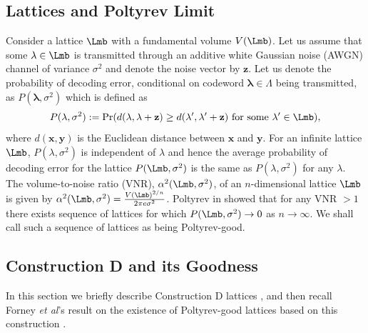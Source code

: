\documentclass[journal]{IEEEtran}
\begin{document}
\subsection{Lattices and Poltyrev Limit}
Consider a lattice $\Lmb$ with a fundamental volume $V(\Lmb)$. Let us assume that some $\mathbf{\lambda}\in\Lmb$ is transmitted through an additive white Gaussian noise (AWGN) channel of variance $\sigma^{2}$ and denote the noise
vector by $\mathbf{z}$. Let us denote the probability of decoding error, conditional on codeword $\mathbf{\lambda}\in\Lambda$ being
transmitted, as $P(\mathbf{\lambda},\sigma^{2})$ which is defined as
\begin{align*}
 P(\mathbf{\lambda},\sigma^{2}):=\Pr(d(\mathbf{\lambda},\mathbf{\lambda}+\mathbf{z})\geq d(\mathbf{\lambda'},\mathbf{\lambda'}+\mathbf{z}) \text{ for some } \mathbf{\lambda'}\in\Lmb),
\end{align*}
where $d(\mathbf{x},\mathbf{y})$ is the Euclidean distance between $\mathbf{x}$ and $\mathbf{y}$. For an infinite lattice $\Lmb$, $P(\lambda,\sigma^{2})$ is independent of $\lambda$ and hence the average probability of decoding error for the lattice  $P(\Lmb,\sigma^{2})$ is the same as $P(\lambda,\sigma^{2})$ for any $\lambda$.
The volume-to-noise ratio (VNR), $\alpha^{2}(\Lmb,\sigma^{2})$,
of an $n$-dimensional lattice $\Lmb$ is given by $\alpha^{2}(\Lmb,\sigma^{2})=\frac{V(\Lmb)^{2/n}}{2\pi e\sigma^{2}}$.
Poltyrev in \cite{poltyrev94} showed that for any VNR $>1$ there exists sequence of lattices for which $P(\Lmb,\sigma^{2}) \rightarrow 0$ as $n \rightarrow \infty$. We shall call such a sequence of lattices as being Poltyrev-good.

\subsection{Construction D and its Goodness}
In this section we briefly describe Construction D lattices \cite{BarnesSloane83}, \cite{conway1999sphere} and then recall Forney {\em et al}'s result on the existence of Poltyrev-good lattices based on this construction \cite{forney2000}.
\end{document}
